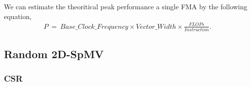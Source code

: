 \documentclass[conference, 10ppt]{IEEEtran}
\begin{document}

We can estimate the theoritical peak performance a single FMA by the following equation,
\begin{eqnarray}
P\ =\ Base\_Clock\_Frequency\times Vector\_Width\times \frac{FLOPs}{Instruction}.
\end{eqnarray}

\subsection{Random 2D-SpMV}
\subsubsection{CSR}
\end{document}
